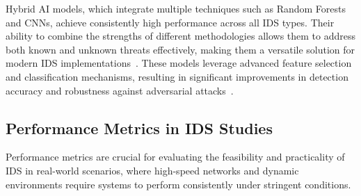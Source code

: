Hybrid AI models, which integrate multiple techniques such as Random Forests and CNNs, achieve consistently high performance across all IDS types. Their ability to combine the strengths of different methodologies allows them to address both known and unknown threats effectively, making them a versatile solution for modern IDS implementations~\cite{Rele2023}. These models leverage advanced feature selection and classification mechanisms, resulting in significant improvements in detection accuracy and robustness against adversarial attacks~\cite{Alotaibi2023AML}.



\subsection{Performance Metrics in IDS Studies}
Performance metrics are crucial for evaluating the feasibility and practicality of IDS in real-world scenarios, where high-speed networks and dynamic environments require systems to perform consistently under stringent conditions.


